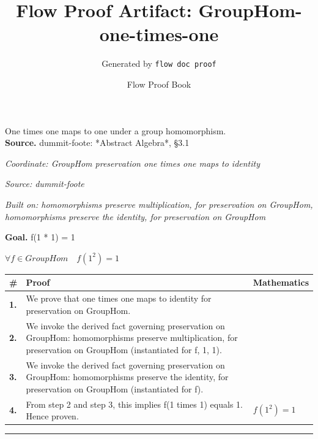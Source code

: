 \documentclass[11pt]{article}
\title{Flow Proof Artifact: GroupHom-one-times-one}
\author{Generated by \texttt{flow doc proof}}
\date{Flow Proof Book}
\theoremstyle{definition}
\begin{document}
\maketitle
One times one maps to one under a group homomorphism.\\[0.5em]
\textbf{Source.} dummit-foote: *Abstract Algebra*, §3.1\\[0.5em]
\bigskip
{}\par
\smallskip\noindent\textit{Coordinate: GroupHom \cdot preservation \cdot one times one maps to identity}\par
\smallskip\noindent\textit{Source: dummit-foote}\par
\smallskip\noindent\textit{Built on: homomorphisms preserve multiplication, for preservation on GroupHom, homomorphisms preserve the identity, for preservation on GroupHom}\par
\medskip
\noindent\textbf{Goal.} f(1 * 1) = 1\par
\noindent$\displaystyle \forall f \in GroupHom\quad f(1^{2}) = 1$\par
\medskip
\noindent
\begin{tabular}{@{} >{\raggedright\arraybackslash}p{} >{\raggedright\arraybackslash}p{} >{\raggedleft\arraybackslash}p{} @{}}
\textbf{\#} & \textbf{Proof} & \textbf{Mathematics} \\
\midrule
\textbf{1.} & We prove that one times one maps to identity for preservation on GroupHom. & \\[0.45em]
\textbf{2.} & We invoke the derived fact governing preservation on GroupHom: homomorphisms preserve multiplication, for preservation on GroupHom (instantiated for f, 1, 1). & \\[0.45em]
\textbf{3.} & We invoke the derived fact governing preservation on GroupHom: homomorphisms preserve the identity, for preservation on GroupHom (instantiated for f). & \\[0.45em]
\textbf{4.} & From step 2 and step 3, this implies f(1 times 1) equals 1. Hence proven. & $\displaystyle f(1^{2}) = 1$ \\[0.45em]
\bottomrule
\end{tabular}
\label{thm:GroupHom-preservation-one_times_one_maps_to_identity}
\par\medskip\hrule
\end{document}
